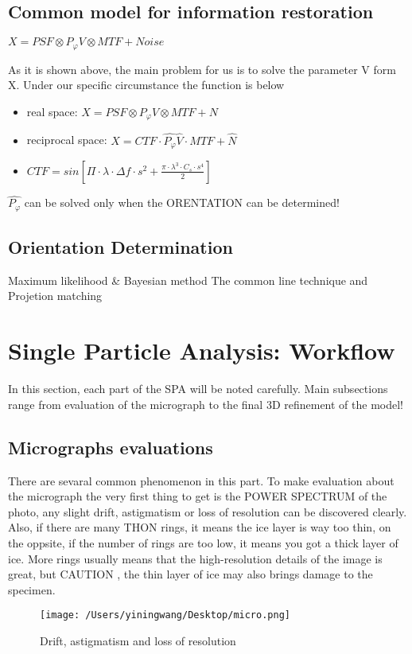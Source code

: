 \documentclass{article}
\begin{document}
    \subsection{Common model for information restoration }
    \begin{center}  
         $X = PSF \otimes P_\varphi V \otimes MTF + Noise$
    \end{center}
    As it is shown above, the main problem for us is to solve the parameter V form X. 
    Under our specific circumstance the function is below
    \begin{center}
        \begin{framed}
            \begin{itemize}
                \item real space:  $X = PSF \otimes P_\varphi V \otimes MTF + N$
                \item reciprocal space: $X = CTF \cdot \hat{P_\varphi}\hat{V} \cdot MTF +\hat{N} $
                \item $CTF = sin[\Pi \cdot \lambda \cdot \varDelta f \cdot s^2 + \frac{\pi \cdot 
                \lambda^3 \cdot C_s \cdot s^4}{2}  ]$
            \end{itemize}  
           
        \end{framed}
    \end{center}
    $\hat{P_\varphi}$ can be solved only when the ORENTATION can be determined!
    \subsection{Orientation Determination}
    Maximum likelihood \& Bayesian method
    The common line technique and Projetion matching

    \section{Single Particle Analysis: Workflow}
    In this section, each part of the SPA will be noted carefully. Main subsections range from 
    evaluation of the micrograph to the final 3D refinement of the model!
    \subsection{Micrographs evaluations}
    There are sevaral common phenomenon in this part. To make evaluation about the micrograph
    the very first thing to get is the POWER SPECTRUM of the photo, any slight drift, astigmatism or 
    loss of resolution can be discovered clearly. Also, if there are many THON rings, it means the ice layer
    is way too thin, on the oppsite, if the number of rings are too low, it means you got a thick layer of ice.
    More rings usually means that the high-resolution details of the image is great, but CAUTION , the thin layer 
    of ice may also brings damage to the specimen.
    \begin{figure}[h]
        \centering   
        \texttt{[image: /Users/yiningwang/Desktop/micro.png]} 
        \caption{\small Drift, astigmatism and loss of resolution}
    \end{figure}
\end{document}
